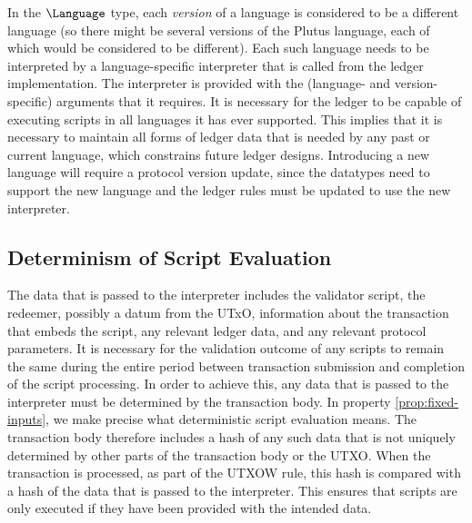 In the $\Language$ type, each \emph{version} of a language is considered to be a different language (so there might be several versions of the Plutus language, each of which would be considered to
be different).
Each such language needs to be interpreted by a language-specific interpreter that is called from the ledger implementation.
The interpreter is provided with the (language- and version-specific) arguments that it requires.
It is necessary for the ledger to be capable of executing scripts in all languages it has ever supported.
This implies that it is necessary to maintain all forms of ledger
data that is needed by any past or current language, which constrains future ledger designs.
Introducing a new language will require a protocol version update, since the datatypes need to support the new language and the ledger rules must be updated to use the new interpreter.

\subsection{Determinism of Script Evaluation}
\label{sec:determinism}

The data that is passed to the interpreter
includes the validator script, the redeemer, possibly a datum from the UTxO, information about the transaction that
embeds the script, any relevant ledger data, and any relevant protocol parameters.
It is necessary for the validation outcome of any scripts to remain the same during the entire
period between transaction
submission and completion of the script processing.
%
In order to achieve this,
any data that is passed to the interpreter must be determined by the transaction body.
In property \ref{prop:fixed-inputs}, we make precise what deterministic script evaluation means.
The transaction body therefore includes a hash of any such data that is not uniquely determined by other parts of the transaction body or the UTXO.
When the transaction is processed, as part of the UTXOW rule, this hash is compared with a hash of the data that is passed to the interpreter. This
ensures that scripts are only executed if they have been provided with the intended data.

